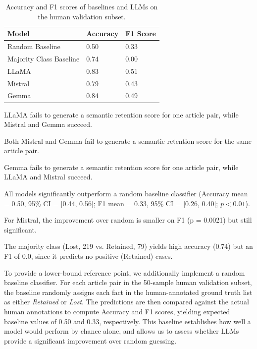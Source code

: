 \documentclass{DESSThesis}
\begin{document}
\begin{table}[h]
\centering
\begin{threeparttable}
\begin{tabularx}{\textwidth}{lXX}
\toprule
\textbf{Model} & \textbf{Accuracy} & \textbf{F1 Score} \\
\midrule
Random Baseline        & 0.50 & 0.33 \\
Majority Class Baseline & 0.74 & 0.00\tnote{$\S$} \\
LLaMA                  & 0.83\tnote{*,$\dag$} & 0.51\tnote{*,$\dag$} \\
Mistral                & 0.79\tnote{**,$\dag$} & 0.43\tnote{**,$\dag$,$\ddag$} \\
Gemma                  & 0.84\tnote{**,***,$\dag$} & 0.49\tnote{**,***,$\dag$} \\
\bottomrule
\end{tabularx}

\begin{tablenotes}\footnotesize
\item[*]   LLaMA fails to generate a semantic retention score for one article pair, while Mistral and Gemma succeed.
\item[**]  Both Mistral and Gemma fail to generate a semantic retention score for the same article pair.
\item[***] Gemma fails to generate a semantic retention score for one article pair, while LLaMA and Mistral succeed.
\item[$\dag$]  All models significantly outperform a random baseline classifier 
(Accuracy mean = 0.50, 95\% CI = [0.44, 0.56]; 
F1 mean = 0.33, 95\% CI = [0.26, 0.40]; 
$p < 0.01$).
\item[$\ddag$]  For Mistral, the improvement over random is smaller on F1 (p = 0.0021) but still significant.
\item[$\S$] The majority class (Lost, 219 vs. Retained, 79) yields high accuracy (0.74) but an F1 of 0.0, since it predicts no positive (Retained) cases.
\end{tablenotes}
\caption{Accuracy and F1 scores of baselines and LLMs on the human validation subset.}
\label{tab:human_validation_results}
\end{threeparttable}
\end{table}

To provide a lower-bound reference point, we additionally implement a random baseline classifier. For each article pair in the 50-sample human validation subset, the baseline randomly assigns each fact in the human-annotated ground truth list as either \textit{Retained} or \textit{Lost}. The predictions are then compared against the actual human annotations to compute Accuracy and F1 scores, yielding expected baseline values of 0.50 and 0.33, respectively. This baseline establishes how well a model would perform by chance alone, and allows us to assess whether LLMs provide a significant improvement over random guessing.
\end{document}
